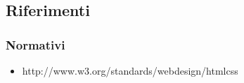 \subsection{Riferimenti}

\subsubsection{Normativi}

\begin{itemize}
	\item http://www.w3.org/standards/webdesign/htmlcss
\end{itemize}
